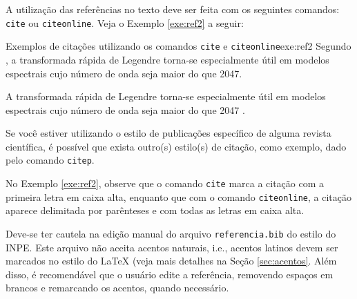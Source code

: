 A utilização das referências no texto deve ser feita com os seguintes comandos: {\tt cite} ou {\tt citeonline}. Veja o Exemplo \ref{exe:ref2} a seguir:

\begin{texexptitled}[breakable,center lower,enhanced,middle=2mm]{Exemplos de citações utilizando os comandos {\tt cite} e {\tt citeonline}}{exe:ref2}
Segundo , a transformada rápida de Legendre
torna-se especialmente útil em modelos espectrais cujo número de onda
seja maior do que 2047.

A transformada rápida de Legendre torna-se especialmente útil em
modelos espectrais cujo número de onda seja maior do que 2047
\cite{wedietal/2013}.
\end{texexptitled}

\begin{marker}
  Se você estiver utilizando o estilo de publicações específico de alguma revista científica, é possível que exista outro(s) estilo(s) de citação, como exemplo, dado pelo comando {\tt citep}.
\end{marker}

No Exemplo \ref{exe:ref2}, observe que o comando {\tt cite} marca a citação com a primeira letra em caixa alta, enquanto que com o comando {\tt citeonline}, a citação aparece delimitada por parênteses e com todas as letras em caixa alta. 


%
%
%
%
%
%
%
%

\begin{marker}
  Deve-se ter cautela na edição manual do arquivo {\tt referencia.bib} do estilo do INPE. Este arquivo não aceita acentos naturais, i.e., acentos latinos devem ser marcados no estilo do \LaTeX{} (veja mais detalhes na Seção \ref{sec:acentos}. Além disso, é recomendável que o usuário edite a referência, removendo espaços em brancos e remarcando os acentos, quando necessário.
\end{marker}

